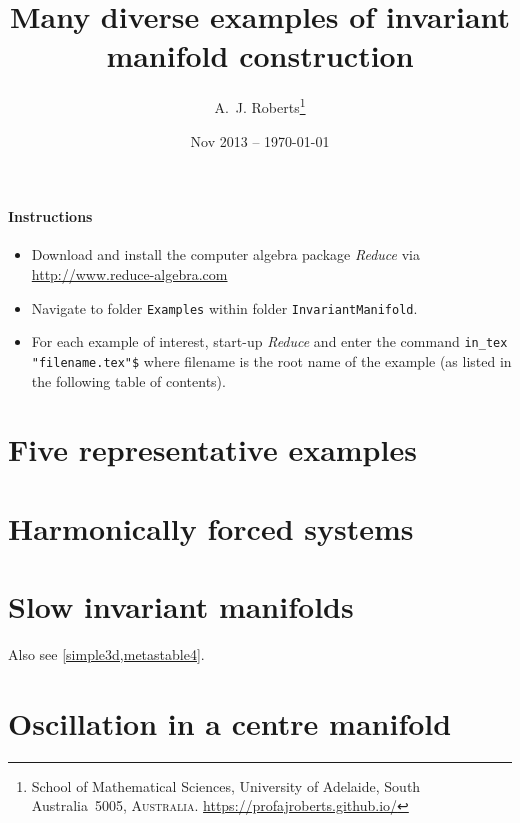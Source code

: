 \documentclass[11pt,a4paper]{refart}
\title{Many diverse examples of invariant manifold construction}
\author{A.~J. Roberts\thanks{School of Mathematical Sciences, University of Adelaide, South Australia~5005, \textsc{Australia}.
\url{https://profajroberts.github.io/}}}
\date{Nov 2013 -- \today}
\begin{document}
\maketitle


\paragraph{Instructions}
\begin{itemize}
\item Download and install the computer algebra package
\emph{Reduce} via \url{http://www.reduce-algebra.com}

\item Navigate to folder \verb|Examples| within folder \verb|InvariantManifold|.

\item For each example of interest, start-up \emph{Reduce} and enter the command \verb|in_tex "filename.tex"$|  where filename is the root name of the example (as listed in the following table of contents).

\end{itemize}


\tableofcontents




\section{Five representative examples}










\section{Harmonically forced systems}







\section{Slow invariant manifolds}

Also see \cref{simple3d,metastable4}.






\section{Oscillation in a centre manifold}
\end{document}
